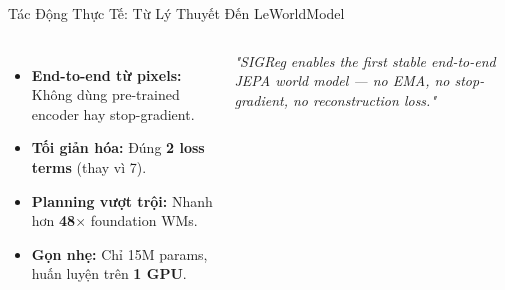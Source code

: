 \documentclass[aspectratio=169,9pt]{beamer}
\newcommand{\cmark}{\ding{51}}
\begin{document}
\begin{frame}{Tác Động Thực Tế: Từ Lý Thuyết Đến LeWorldModel}
\begin{columns}[c]
\vspace{0.3cm}
\begin{itemize}\small
  \setlength{\itemsep}{0.6em}
  \item[\textcolor{mgood}{\textbf{\cmark}}] \textbf{End-to-end từ pixels:} Không dùng pre-trained encoder hay stop-gradient.
  \item[\textcolor{mgood}{\textbf{\cmark}}] \textbf{Tối giản hóa:} Đúng \textbf{2 loss terms} (thay vì 7).
  \item[\textcolor{mgood}{\textbf{\cmark}}] \textbf{Planning vượt trội:} Nhanh hơn \textbf{48$\times$} foundation WMs.
  \item[\textcolor{mgood}{\textbf{\cmark}}] \textbf{Gọn nhẹ:} Chỉ 15M params, huấn luyện trên \textbf{1 GPU}.
\end{itemize}

\vspace{0.5cm}
\begin{accentbox}
\centering\small\itshape
"SIGReg enables the first stable end-to-end JEPA world model — no EMA, no stop-gradient, no reconstruction loss."
\end{accentbox}

\end{columns}

\end{frame}
\end{document}
